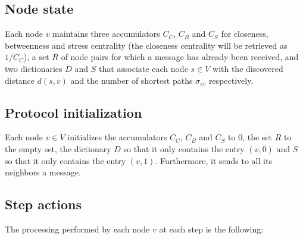 \subsection{Node state}

Each node $v$ maintains three accumulators $C_C$, $C_B$ and $C_S$ for closeness, betweenness and stress centrality (the closeness centrality will be retrieved as $1/C_C$), a set $R$ of node pairs for which a \mrep{} message has already been received, and two dictionaries $D$ and $S$ that associate each node $s \in V$ with the discovered distance $d(s,v)$ and the number of shortest paths $\sigma_{sv}$ respectively.

\subsection{Protocol initialization}

Each node $v \in V$ initializes the accumulators $C_C$, $C_B$ and $C_S$ to $0$, the set $R$ to the empty set, the dictionary $D$ so that it only contains the entry $(v,0)$ and $S$ so that it only contains the entry $(v,1)$. Furthermore, it sends to all its neighbors a  message.

\subsection{Step actions}
\label{deccen:step}
The processing performed by each node $v$ at each step is the following:

